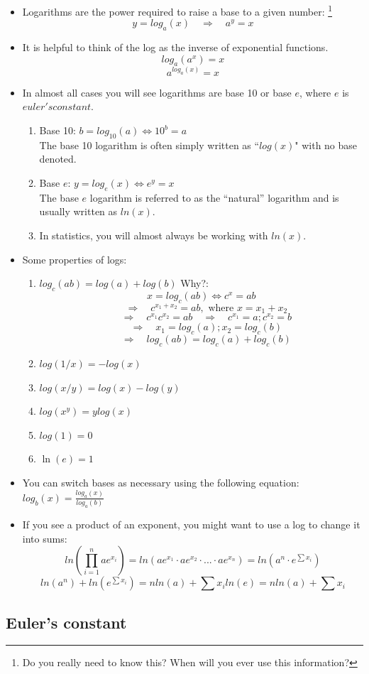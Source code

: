 \documentclass[20pt]{extarticle}
\newcommand{\bi}{\begin{itemize}}
\newcommand{\ei}{\end{itemize}}
\newcommand{\be}{\begin{enumerate}}
\newcommand{\ee}{\end{enumerate}}
\newcommand{\lra}{\Longrightarrow}
\newcommand{\qlq}{\quad\lra\quad}
\begin{document}
\bi
\item Logarithms are the power required to raise a base to a given
  number: \footnote{Do you really need to know this?  When will you
    ever use this information?} \\
$$y = log_a(x) \qlq a^y = x$$
\item It is helpful to think of the log as the inverse of exponential
  functions.  
$$log_a(a^x) = x$$ 
$$a^{log_a(x)}=x$$
\item In almost all cases you will see logarithms are base 10 or base
  $e$, where $e$ is $euler's constant$.
\be
\item Base 10: $b = log_{10}(a) \iff 10^b = a$ \\
The base 10 logarithm is often simply written as ``$log(x)$" with no
base denoted.
\item Base $e$: $y=log_e(x) \iff e^y = x$ \\
The base $e$ logarithm is referred to as the ``natural'' logarithm and
is usually written as  $ln(x)$.
\item In statistics, you will almost always be working with $ln(x)$.
\ee
\item Some properties of logs:
\be
\item $log_c(ab) = log(a) + log(b)$ Why?:\\
$$ x = log_c(ab) \iff c^x=ab $$
$$\qlq c^{x_1+x_2} = ab, \mbox{  where } x = x_1 + x_2$$
$$\qlq c^{x_1}c^{x_2}=ab \qlq c^{x_1}=a; c^{x_2}=b$$
$$\qlq x_1 = log_c(a); x_2 = log_c(b) $$
$$\qlq log_c(ab) = log_c(a) + log_c(b)$$
\item $log(1/x) = - log(x)$
\item $log(x/y) = log(x) - log(y)$
\item $log(x^y) = ylog(x)$
\item $log(1) = 0$
\item $\ln(e)=1$
\ee
\item You can switch bases as necessary using the following equation:
  $log_b(x) = \frac{log_a(x)}{log_a(b)}$
\item If you see a product of an exponent, you might want to use a log
  to change it into sums:
$$ln(\prod_{i=1}^nae^{x_i}) = ln(ae^{x_1} \cdot ae^{x_2} \cdot ... \cdot ae^{x_n}) = ln(a^n \cdot e^{\sum x_i})$$
$$ ln(a^n) + ln(e^{\sum x_i}) = nln(a) + \sum x_i ln(e) = nln(a) + \sum x_i $$
 
\ei


\subsection{Euler's constant}
\end{document}
